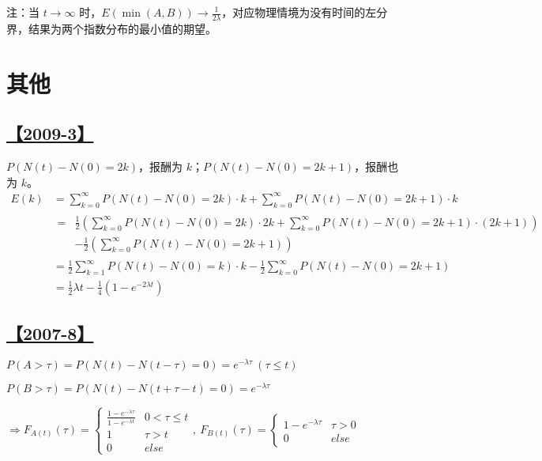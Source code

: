 注：当 $t\rightarrow\infty$ 时，$E(\min(A, B))\rightarrow\frac{1}{2\lambda}$，对应物理情境为没有时间的左分界，结果为两个指数分布的最小值的期望。

\section{其他}

\subsection{\hyperref[Q2009-3]{【2009-3】}}\label{A2009-3}

$P(N(t)-N(0)=2k)$，报酬为 $k$；$P(N(t)-N(0)=2k+1)$，报酬也为 $k$。
\begin{equation}\tag*{}
\begin{split}
E(k)&=\sum_{k=0}^{\infty}P(N(t)-N(0)=2k)\cdot k+\sum_{k=0}^{\infty}P(N(t)-N(0)=2k+1)\cdot k\\
&\begin{split}=&\frac{1}{2}\left(\sum_{k=0}^{\infty}P(N(t)-N(0)=2k)\cdot 2k+\sum_{k=0}^{\infty}P(N(t)-N(0)=2k+1)\cdot (2k+1)\right)\\&-\frac{1}{2}\left(\sum_{k=0}^{\infty}P(N(t)-N(0)=2k+1)\right)\end{split}\\
&=\frac{1}{2}\sum_{k=1}^{\infty}P(N(t)-N(0)=k)\cdot k-\frac{1}{2}\sum_{k=0}^{\infty}P(N(t)-N(0)=2k+1)\\
&=\frac{1}{2}\lambda t-\frac{1}{4}(1-e^{-2\lambda t})
\end{split}
\end{equation}

\subsection{\hyperref[Q2007-8]{【2007-8】}}\label{A2007-8}

$P(A>\tau)=P(N(t)-N(t-\tau)=0)=e^{-\lambda \tau}\ (\tau\le t)$

$P(B>\tau)=P(N(t)-N(t+\tau-t)=0)=e^{-\lambda \tau}$

$\Rightarrow F_{A(t)}(\tau)=\begin{cases}\frac{1-e^{-\lambda \tau}}{1-e^{-\lambda t}} & 0<\tau\le t\\1&\tau>t\\0 & else\end{cases},\ F_{B(t)}(\tau)=\begin{cases}1-e^{-\lambda \tau} & \tau>0\\0 & else\end{cases}$

